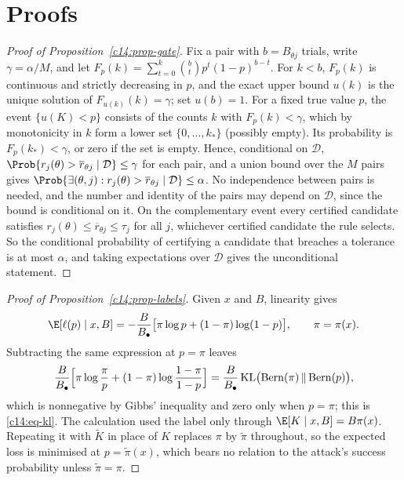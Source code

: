 \section{Proofs}

\begin{proof}[Proof of Proposition~\ref{c14:prop-gate}]
Fix a pair with $b = B_{\theta j}$ trials, write $\gamma = \alpha/M$, and let
$F_p(k) = \sum_{t=0}^{k}\binom{b}{t}p^t(1-p)^{b-t}$. For $k < b$, $F_p(k)$ is continuous
and strictly decreasing in $p$, and the exact upper bound $u(k)$ is the unique solution
of $F_{u(k)}(k) = \gamma$; set $u(b) = 1$. For a fixed true value $p$, the event
$\{u(K) < p\}$ consists of the counts $k$ with $F_p(k) < \gamma$, which by monotonicity
in $k$ form a lower set $\{0,\dots,k_*\}$ (possibly empty). Its probability is
$F_p(k_*) < \gamma$, or zero if the set is empty. Hence, conditional on $\mathcal D$,
$\Prob\{r_j(\theta) > \overline r_{\theta j} \mid \mathcal D\} \le \gamma$ for each
pair, and a union bound over the $M$ pairs gives
$\Prob\{\exists(\theta,j): r_j(\theta) > \overline r_{\theta j} \mid \mathcal D\} \le
\alpha$. No independence between pairs is needed, and the number and identity of the
pairs may depend on $\mathcal D$, since the bound is conditional on it. On the
complementary event every certified candidate satisfies $r_j(\theta) \le
\overline r_{\theta j} \le \tau_j$ for all $j$, whichever certified candidate the rule
selects. So the conditional probability of certifying a candidate that breaches a
tolerance is at most $\alpha$, and taking expectations over $\mathcal D$ gives the
unconditional statement.
\end{proof}

\begin{proof}[Proof of Proposition~\ref{c14:prop-labels}]
Given $x$ and $B$, linearity gives
\[
\E[\ell(p)\mid x,B] = -\frac{B}{B_\bullet}\bigl[\pi\log p + (1-\pi)\log(1-p)\bigr],
\qquad \pi = \pi(x).
\]
Subtracting the same expression at $p = \pi$ leaves
\[
\frac{B}{B_\bullet}\Bigl[\pi\log\frac{\pi}{p} + (1-\pi)\log\frac{1-\pi}{1-p}\Bigr]
= \frac{B}{B_\bullet}\,\mathrm{KL}\bigl(\mathrm{Bern}(\pi)\,\|\,\mathrm{Bern}(p)\bigr),
\]
which is nonnegative by Gibbs' inequality and zero only when $p = \pi$; this is
\eqref{c14:eq-kl}. The calculation used the label only through
$\E[K\mid x,B] = B\pi(x)$. Repeating it with $\widetilde K$ in place of $K$ replaces
$\pi$ by $\widetilde\pi$ throughout, so the expected loss is minimised at
$p = \widetilde\pi(x)$, which bears no relation to the attack's success probability
unless $\widetilde\pi = \pi$.
\end{proof}

